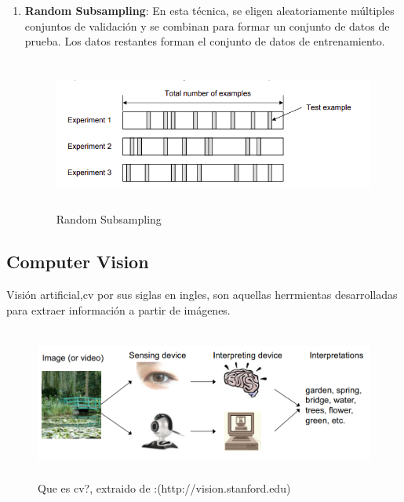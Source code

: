 \begin{enumerate}
\item \textbf{Random Subsampling}: En esta técnica, se eligen aleatoriamente múltiples conjuntos de validación y se combinan para formar un conjunto de datos de prueba. Los datos restantes forman el conjunto de datos de entrenamiento.

\begin{figure}[H]
 \centering
  \includegraphics[height=5cm,keepaspectratio=true,clip=true]{imagenes/MarcoTeorico/cross-validation-random.png}
  \caption{Random Subsampling}
	\label{Fig: random-Subsampling}
\end{figure}

\end{enumerate}



\subsection{Computer Vision}
Visión artificial,\ac{cv} por sus siglas en ingles, son aquellas herrmientas desarrolladas para extraer información a partir de imágenes.
\begin{figure}[H]
 \centering
  \includegraphics[height=5cm,keepaspectratio=true,clip=true]{imagenes/MarcoTeorico/computer-vision.png}
  \caption{Que es \ac{cv}?, extraido de :(http://vision.stanford.edu)}
	\label{Fig: computer-vision}
\end{figure}

